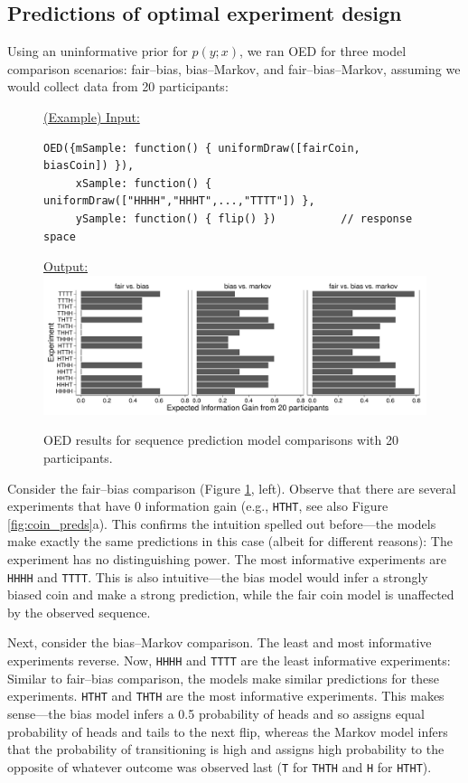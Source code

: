 \documentclass{article}
\begin{document}
\subsection{Predictions of optimal experiment design}

Using an uninformative prior for $p(y; x)$, we ran OED for three model comparison scenarios: fair--bias, bias--Markov, and fair--bias--Markov, assuming we would collect data from 20 participants:

\begin{figure}[h]
\underline{\textsf{(Example) Input:}}
\begin{lstlisting}
OED({mSample: function() { uniformDraw([fairCoin, biasCoin]) }),
     xSample: function() { uniformDraw(["HHHH","HHHT",...,"TTTT"]) }, 
     ySample: function() { flip() })          // response space
\end{lstlisting}
\underline{\textsf{Output:}}\\
\includegraphics[width=\columnwidth]{img/coin_eig_n20_ignorance.pdf}
\caption{OED results for sequence prediction model comparisons with 20 participants.}
\label{fig:run-coin}
\end{figure}
Consider the fair--bias comparison (Figure \ref{fig:run-coin}, left).
Observe that there are several experiments that have 0 information gain (e.g., \lstinline{HTHT}, see also Figure \ref{fig:coin_preds}a).
This confirms the intuition spelled out before---the models make exactly the same predictions in this case (albeit for different reasons): The experiment has no distinguishing power.
The most informative experiments are \lstinline{HHHH} and \lstinline{TTTT}.
This is also intuitive---the bias model would infer a strongly biased coin and make a strong prediction, while the fair coin model is unaffected by the observed sequence.

Next, consider the bias--Markov comparison.
The least and most informative experiments reverse.
Now, \lstinline{HHHH} and \lstinline{TTTT} are the least informative experiments: Similar to fair--bias comparison, the models make similar predictions for these experiments.
\lstinline{HTHT} and \lstinline{THTH} are the most informative experiments.
This makes sense---the bias model infers a 0.5 probability of heads and so assigns equal probability of heads and tails to the next flip, whereas the Markov model infers that the probability of transitioning is high and assigns high probability to the opposite of whatever outcome was observed last (\lstinline{T} for \lstinline{THTH} and \lstinline{H} for \lstinline{HTHT}).
\end{document}
